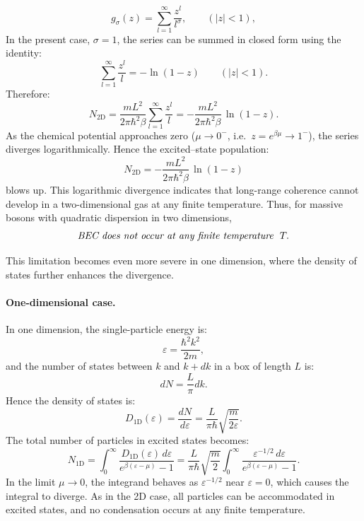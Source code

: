 \begin{equation}
    g_{\sigma}(z) = \sum_{l=1}^{\infty} \frac{z^l}{l^{\sigma}},
    \qquad (|z|<1),
\end{equation}
In the present case, \(\sigma = 1\), the series can be summed in closed form using the identity:
\[
    \sum_{l=1}^{\infty} \frac{z^l}{l} = -\ln(1-z)\qquad (|z|<1).
\]
Therefore:
\[
    N_{2\mathrm{D}} 
    = \frac{mL^2}{2\pi \hbar^2 \beta}
      \sum_{l=1}^{\infty} \frac{z^l}{l}
    = -\frac{mL^2}{2\pi \hbar^2 \beta}\, \ln(1 - z).
\]
As the chemical potential approaches zero (\(\mu \to 0^{-}\), i.e.\ \(z=e^{\beta\mu}\to 1^{-}\)), the series diverges logarithmically. Hence the excited–state population:
\begin{equation}
    N_{2\mathrm{D}} = -\frac{mL^2}{2\pi \hbar^2 \beta}\,\ln(1-z)
\end{equation}
blows up. This logarithmic divergence indicates that long-range coherence cannot develop in a two-dimensional gas at any finite temperature. Thus, for massive bosons with quadratic dispersion in two dimensions,
\[
    \textit{BEC does not occur at any finite temperature \;} T.
\]

 This limitation becomes even more severe in one dimension, where the density of states further enhances the divergence.

\paragraph{One-dimensional case.}
In one dimension, the single-particle energy is:
\[
    \varepsilon = \frac{\hbar^2 k^2}{2m},
\]
and the number of states between \(k\) and \(k + dk\) in a box of length \(L\) is:
\[
    dN = \frac{L}{\pi} dk.
\]
Hence the density of states is:
\begin{equation}
    D_{1\mathrm{D}}(\varepsilon)
    = \frac{dN}{d\varepsilon}
    = \frac{L}{\pi \hbar} \sqrt{\frac{m}{2\varepsilon}}.
    \label{eq:DOS_1D}
\end{equation}
The total number of particles in excited states becomes:
\begin{equation}
    N_{1\mathrm{D}} = 
    \int_0^{\infty}
    \frac{D_{1\mathrm{D}}(\varepsilon)\, d\varepsilon}
         {e^{\beta(\varepsilon - \mu)} - 1}
    = \frac{L}{\pi \hbar} \sqrt{\frac{m}{2}}
      \int_0^{\infty}
      \frac{\varepsilon^{-1/2}\, d\varepsilon}
           {e^{\beta(\varepsilon - \mu)} - 1}.
\end{equation}
In the limit \(\mu \to 0\), the integrand behaves as \(\varepsilon^{-1/2}\) near \(\varepsilon = 0\), which causes the integral to diverge.  
As in the 2D case, all particles can be accommodated in excited states, and no condensation occurs at any finite temperature.

